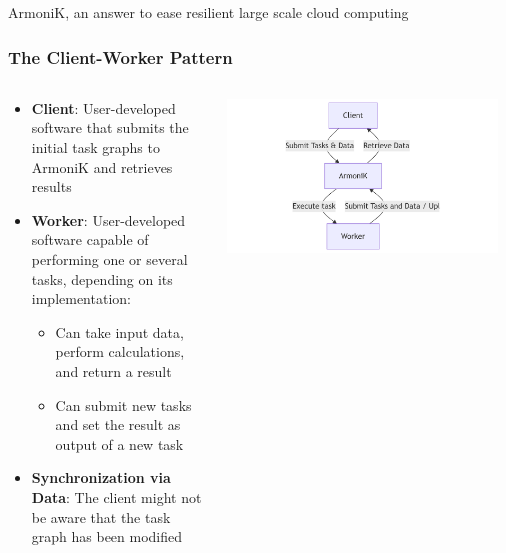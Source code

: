\documentclass[10pt,aspectratio=1609]{beamer}
\begin{document}
\begin{section}{ArmoniK, an answer to ease resilient large scale cloud computing}
  \begin{frame}
    \frametitle{The Client-Worker Pattern}
    \begin{columns}[T]
      \begin{column}{0.5\textwidth}
        \begin{itemize}
          \item \textbf{Client}: User-developed software that submits the initial task graphs to ArmoniK and retrieves results
          \item \textbf{Worker}: User-developed software capable of performing one or several tasks, depending on its implementation:
          \begin{itemize}
            \item Can take input data, perform calculations, and return a result
            \item Can submit new tasks and set the result as output of a new task
          \end{itemize}
          \item \textbf{Synchronization via Data}: The client might not be aware that the task graph has been modified
        \end{itemize}
      \end{column}
      \begin{column}{0.5\textwidth}
        \centering
        \includegraphics[width=0.95\textwidth]{mermaid-client-worker.png}
      \end{column}
    \end{columns}
  \end{frame}


\end{section}
\end{document}
